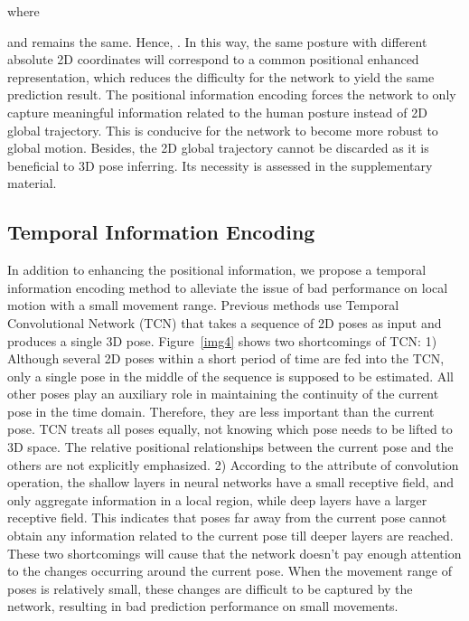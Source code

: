 \documentclass[sigconf]{acmart}
\begin{document}
where

and  remains the same. Hence, . In this way, the same posture with different absolute 2D coordinates will correspond to a common positional enhanced representation, which reduces the difficulty for the network to yield the same prediction result. The positional information encoding forces the network to only capture meaningful information related to the human posture instead of 2D global trajectory. This is conducive for the network to become more robust to global motion. Besides, the 2D global trajectory cannot be discarded as it is beneficial to 3D pose inferring. Its necessity is assessed in the supplementary material.




\subsection{Temporal Information Encoding}\label{T-ENH}
In addition to enhancing the positional information, we propose a temporal information encoding method to alleviate the issue of bad performance on local motion with a small movement range. Previous methods \cite{jllo20193d,liu2020attention} use Temporal Convolutional Network (TCN) that takes a sequence of 2D poses as input and produces a single 3D pose. Figure~\ref{img4} shows two shortcomings of TCN: 1) Although several 2D poses within a short period of time are fed into the TCN, only a single pose in the middle of the sequence is supposed to be estimated. All other poses play an auxiliary role in maintaining the continuity of the current pose in the time domain. Therefore, they are less important than the current pose. TCN treats all poses equally, not knowing which pose needs to be lifted to 3D space. The relative positional relationships between the current pose and the others are not explicitly emphasized. 2) According to the attribute of convolution operation, the shallow layers in neural networks have a small receptive field, and only aggregate information in a local region, while deep layers have a larger receptive field. This indicates that poses far away from the current pose cannot obtain any information related to the current pose till deeper layers are reached. These two shortcomings will cause that the network doesn’t pay enough attention to the changes occurring around the current pose. When the movement range of poses is relatively small, these changes are difficult to be captured by the network, resulting in bad prediction performance on small movements.
\end{document}
